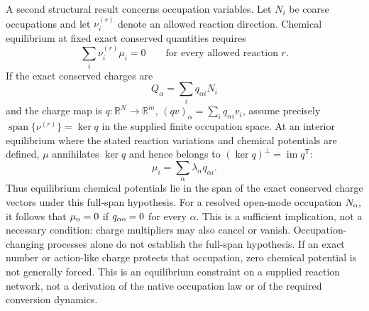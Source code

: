 \documentclass[11pt]{article}
\theoremstyle{definition}
\begin{document}
A second structural result concerns occupation variables.  Let $N_i$ be coarse occupations
and let $\nu_i^{(r)}$ denote an allowed reaction direction.  Chemical equilibrium at fixed
exact conserved quantities requires
\begin{equation}
  \sum_i\nu_i^{(r)}\mu_i=0
  \qquad\text{for every allowed reaction }r.
  \label{eq:chemical-equilibrium-network}
\end{equation}
If the exact conserved charges are
\begin{equation}
  Q_\alpha=\sum_i q_{\alpha i}N_i
  \label{eq:conserved-occupation-charges}
\end{equation}
and the charge map is $q:\mathbb R^{N}\to\mathbb R^{m}$,
$(qv)_\alpha=\sum_iq_{\alpha i}v_i$, assume precisely
$\operatorname{span}\{\nu^{(r)}\}=\ker q$ in the supplied finite occupation
space. At an interior equilibrium where the stated reaction variations and
chemical potentials are defined, $\mu$ annihilates $\ker q$ and hence belongs
to $(\ker q)^\perp=\operatorname{im}q^{\mathsf T}$:
\begin{equation}
  \boxed{
  \mu_i=\sum_\alpha\lambda_\alpha q_{\alpha i}.}
  \label{eq:chemical-potential-charge-span}
\end{equation}
Thus equilibrium chemical potentials lie in the span of the exact conserved
charge vectors under this full-span hypothesis. For a resolved open-mode
occupation $N_{\rm o}$, it follows that $\mu_{\rm o}=0$ if
$q_{\alpha{\rm o}}=0$ for every $\alpha$. This is a sufficient implication,
not a necessary condition: charge multipliers may also cancel or vanish.
Occupation-changing processes alone do not establish the full-span hypothesis.
If an exact number or action-like charge protects that occupation, zero
chemical potential is not generally forced.  This is an equilibrium constraint on a
supplied reaction network, not a derivation of the native occupation law or of the required
conversion dynamics.
\end{document}
